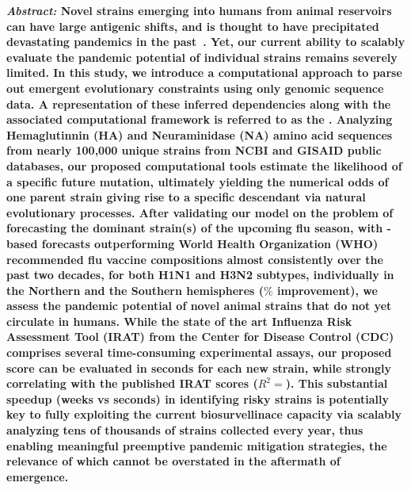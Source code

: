 \documentclass[onecolumn, compsoc,10pt]{IEEEtran}
\begin{document}
  
 
\maketitle
 
  {\bf \sffamily \fontsize{10}{12}\selectfont \noindent   
    {\normalfont \itshape Abstract:} %
    Novel \infl  strains emerging into humans from animal reservoirs can have large antigenic shifts, and is thought to  have precipitated devastating  pandemics in the past~\cite{shao2017evolution,mills2004transmissibility,reid2003origin,landolt2007up}. Yet, our current ability to  scalably  evaluate the pandemic potential of   individual strains  remains severely limited. In this study, we introduce a computational approach to  parse out emergent evolutionary constraints using only genomic sequence data. A representation of these  inferred dependencies along with the associated computational framework is referred to as the \enet.   Analyzing    Hemaglutinnin (HA) and Neuraminidase (NA) amino acid sequences from nearly 100,000 unique \infl  strains from NCBI and GISAID public  databases, our proposed computational tools  estimate the likelihood of a specific future  mutation, ultimately  yielding the  numerical odds of one parent strain giving rise to a specific descendant via natural evolutionary processes.
After validating our model on the problem of forecasting the dominant strain(s) of the upcoming flu season, with \enet-based forecasts  outperforming World Health Organization (WHO) recommended flu vaccine compositions almost consistently over the past two decades, for both H1N1 and H3N2 subtypes, individually in the Northern and the Southern hemispheres ($\% $ improvement), we assess  the pandemic potential  of novel animal  strains that do not yet circulate in humans. While the state of the art  Influenza Risk Assessment Tool (IRAT) from the Center for Disease Control (CDC) comprises several time-consuming experimental assays, our proposed \erisk score can be evaluated in seconds for each new strain, while strongly correlating with the published IRAT scores ($R^2=$). This  substantial speedup (weeks vs seconds) in  identifying risky strains is potentially key to fully exploiting the  current biosurvellinace capacity via scalably analyzing tens of thousands of strains collected every year, thus  enabling  meaningful preemptive pandemic mitigation strategies, the relevance of which cannot be overstated in the aftermath of \hcov emergence.
}
\end{document}
